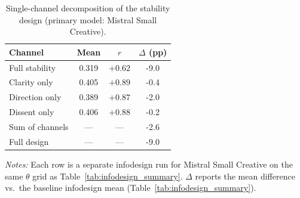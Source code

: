 \begin{table}[t]
\centering
\caption{Single-channel decomposition of the stability design (primary model: Mistral Small Creative).}
\label{tab:decomposition}
\small
\begin{tabular}{lccc}
\toprule
Channel & Mean & $r$ & $\Delta$ (pp) \\
\midrule
Full stability & 0.319 & $+0.62$ & -9.0 \\
Clarity only & 0.405 & $+0.89$ & -0.4 \\
Direction only & 0.389 & $+0.87$ & -2.0 \\
Dissent only & 0.406 & $+0.88$ & -0.2 \\
\midrule
Sum of channels & --- & --- & -2.6 \\
Full design & --- & --- & -9.0 \\
\bottomrule
\end{tabular}
\vspace{0.25em}
\parbox{\columnwidth}{\footnotesize\emph{Notes:} Each row is a separate infodesign run for Mistral Small Creative on the same $\theta$ grid as Table~\ref{tab:infodesign_summary}. $\Delta$ reports the mean difference vs.\ the baseline infodesign mean (Table~\ref{tab:infodesign_summary}).}
\end{table}
